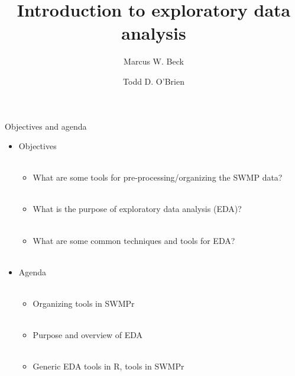 \documentclass[xcolor=svgnames]{beamer}\usepackage[]{graphicx}\usepackage[]{color}
\begin{document}
\title[Intro to EDA]{Introduction to exploratory data analysis}

\author[M. Beck, T. O'Brien]{Marcus W. Beck \and Todd D. O'Brien}

\date{}







\begin{frame}{Objectives and agenda}
\begin{itemize}
\onslide<+->
\item Objectives \\~\\
\begin{itemize}
\item What are some tools for pre-processing/organizing the SWMP data? \\~\\
\item What is the purpose of exploratory data analysis (EDA)? \\~\\
\item What are some common techniques and tools for EDA? \\~\\
\end{itemize}
\onslide<+->
\item Agenda \\~\\
\begin{itemize}
\item Organizing tools in SWMPr \\~\\
\item Purpose and overview of EDA \\~\\
\item Generic EDA tools in R, tools in SWMPr\\~\\
\end{itemize}
\end{itemize}
\end{frame}
\end{document}

